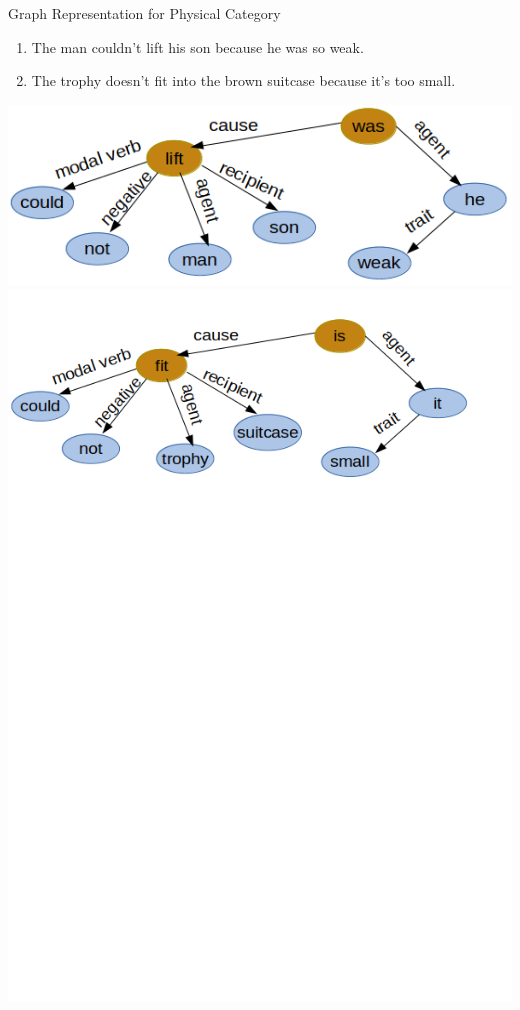 \documentclass[smaller,dvipsnames,ratio=169]{beamer}
\begin{document}
\begin{frame}{Graph Representation for Physical Category}
\begin{enumerate}
		\item The man couldn't lift his son because he was so weak. 
		\item The trophy doesn't fit into the brown suitcase because it's too small.
	\end{enumerate}
		\centering
{}	\includegraphics[scale=0.4]{graph_1.png}  
	\includegraphics[scale=0.4]{graph_2.png} 
\end{frame}
\end{document}
